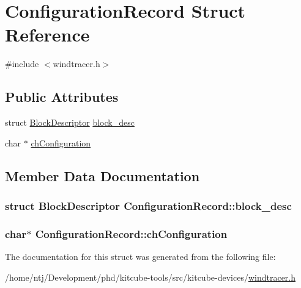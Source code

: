 \hypertarget{structConfigurationRecord}{\section{Configuration\-Record Struct Reference}
\label{structConfigurationRecord}
}


{\ttfamily \#include $<$windtracer.\-h$>$}

\subsection*{Public Attributes}
\begin{DoxyCompactItemize}
\item 
struct \hyperlink{structBlockDescriptor}{Block\-Descriptor} \hyperlink{structConfigurationRecord_a1e8e13368061b97fa7d2763bb5152e2a}{block\-\_\-desc}
\item 
char $\ast$ \hyperlink{structConfigurationRecord_a961d871fc719aa11527c52830df1bcb9}{ch\-Configuration}
\end{DoxyCompactItemize}


\subsection{Member Data Documentation}
\hypertarget{structConfigurationRecord_a1e8e13368061b97fa7d2763bb5152e2a}{
\subsubsection[{block\-\_\-desc}]{\setlength{\rightskip}{0pt plus 5cm}struct {\bf Block\-Descriptor} Configuration\-Record\-::block\-\_\-desc}}\label{structConfigurationRecord_a1e8e13368061b97fa7d2763bb5152e2a}
\hypertarget{structConfigurationRecord_a961d871fc719aa11527c52830df1bcb9}{
\subsubsection[{ch\-Configuration}]{\setlength{\rightskip}{0pt plus 5cm}char$\ast$ Configuration\-Record\-::ch\-Configuration}}\label{structConfigurationRecord_a961d871fc719aa11527c52830df1bcb9}


The documentation for this struct was generated from the following file\-:\begin{DoxyCompactItemize}
\item 
/home/ntj/\-Development/phd/kitcube-\/tools/src/kitcube-\/devices/\hyperlink{windtracer_8h}{windtracer.\-h}\end{DoxyCompactItemize}
